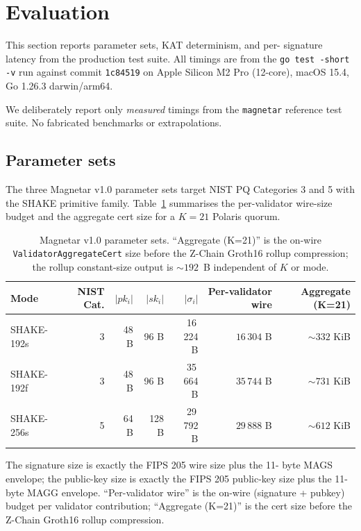 \section{Evaluation}
\label{sec:evaluation}

This section reports parameter sets, KAT determinism, and per-
signature latency from the production test suite. All timings are
from the \texttt{go test -short -v} run against commit
\texttt{1c84519} on Apple Silicon M2 Pro (12-core), macOS 15.4,
Go 1.26.3 darwin/arm64.

We deliberately report only \emph{measured} timings from the
\texttt{magnetar} reference test suite. No fabricated benchmarks
or extrapolations.

\subsection{Parameter sets}
\label{sec:eval:params}

The three Magnetar v1.0 parameter sets target NIST PQ Categories
3 and 5 with the SHAKE primitive family. Table~\ref{tab:eval-params}
summarises the per-validator wire-size budget and the aggregate
cert size for a $K=21$ Polaris quorum.

\begin{table}[H]
\centering
\caption{Magnetar v1.0 parameter sets. ``Aggregate (K=21)'' is the
on-wire \texttt{ValidatorAggregateCert} size before the Z-Chain
Groth16 rollup compression; the rollup constant-size output is
$\sim 192$~B independent of $K$ or mode.}
\label{tab:eval-params}
\begin{tabular}{lrrrrrr}
\toprule
Mode & NIST Cat. & $|pk_i|$ & $|sk_i|$ & $|\sigma_i|$ & Per-validator wire & Aggregate (K=21) \\
\midrule
SHAKE-192s & 3 & 48 B & 96 B & 16\,224 B & $16\,304$ B & $\sim 332$ KiB \\
SHAKE-192f & 3 & 48 B & 96 B & 35\,664 B & $35\,744$ B & $\sim 731$ KiB \\
SHAKE-256s & 5 & 64 B & 128 B & 29\,792 B & $29\,888$ B & $\sim 612$ KiB \\
\bottomrule
\end{tabular}
\end{table}

The signature size is exactly the FIPS 205 wire size plus the 11-
byte MAGS envelope; the public-key size is exactly the FIPS 205
public-key size plus the 11-byte MAGG envelope. ``Per-validator
wire'' is the on-wire (signature + pubkey) budget per validator
contribution; ``Aggregate (K=21)'' is the cert size before the
Z-Chain Groth16 rollup compression.

